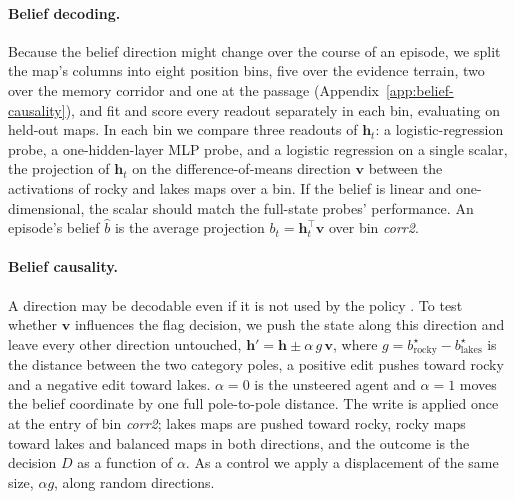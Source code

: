 \paragraph{Belief decoding.}
\label{sec:decoding}
Because the belief direction might change over the course of an episode, we split the map's columns into eight position bins, five over the evidence terrain, two over the memory corridor and one at the passage (Appendix~\ref{app:belief-causality}), and fit
and score every readout separately in each bin, evaluating on held-out maps.
In each bin we compare three readouts of $\mathbf{h}_t$: a logistic-regression probe, a one-hidden-layer MLP probe, and a logistic regression on a single scalar, the projection of $\mathbf{h}_t$ on the difference-of-means direction $\mathbf{v}$ between the activations of rocky and lakes maps over a bin. If the belief is linear and one-dimensional, the scalar should match the full-state probes' performance. An episode's belief $\hat b$ is the average projection $b_t=\mathbf{h}_t^{\top}\mathbf{v}$ over bin \textit{corr2}.

\paragraph{Belief causality.}
\label{sec:causality}
A direction may be decodable even if it is not used by the policy \citep{alain2017probes}. To test whether
$\mathbf{v}$ influences the flag decision, we push the state along this direction and leave every other
direction untouched,
$\mathbf{h}'=\mathbf{h}\pm \alpha\,g\,\mathbf{v}$,
where $g=b^{\star}_{\text{rocky}}-b^{\star}_{\text{lakes}}$ is the distance between
the two category poles, a positive edit pushes toward rocky and a negative edit toward lakes. $\alpha=0$ is the unsteered agent and $\alpha=1$ moves the
belief coordinate by one full pole-to-pole distance. The write is applied once at
the entry of bin \textit{corr2}; lakes maps are pushed toward rocky, rocky maps
toward lakes and balanced maps in both directions, and the outcome is the
decision $D$ as a function of $\alpha$. As a control we apply a displacement of
the same size, $\alpha g$, along random directions.

